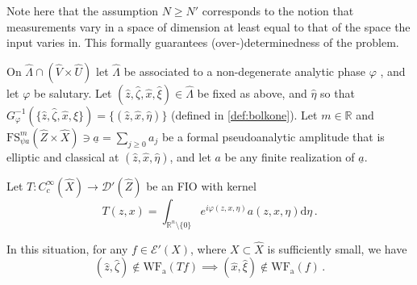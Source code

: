 \documentclass[
	fontsize=11pt, 
	twoside=false, 
	abstract=true, 
	a4paper,
]{scrartcl}
\newcommand{\sem}{\setminus\{0\}}
\newcommand{\RR}{\mathbb{R}}
\newcommand{\dd}{\mathrm{d}}
\newcommand{\wf}{\mathrm{WF}_{\mathrm{a}}}
\newcommand{\ud}[1]{\underline{#1}}
\begin{document}
Note here that the assumption $N\geq N'$ corresponds to the notion that measurements vary in a space of dimension at least equal to that of the space the input varies in. This formally guarantees (over-)determinedness of the problem.

\begin{theorem}\label{thm:main}
	On $\hat\Lambda \cap (\hat V\times \hat U)$ let $\hat\Lambda$ be associated to a non-degenerate analytic phase $\varphi$%
	, and let $\varphi$ be salutary. Let $(\hat z, \hat \zeta, \hat x, \hat \xi) \in \hat\Lambda$ be fixed as above, and $\hat \eta$ so that $G_\varphi^{-1}(\{\hat z, \hat \zeta, \hat x, \hat \xi\}) = \{(\hat z, \hat x,\hat\eta)\}$ (defined in \cref{def:bolkone}). 
	Let $m\in\RR$ and $\mathrm{FS}^{m}_{\psi a}(\hat Z\times \hat X) \ni \ud{a} = \sum_{j\geq 0} a_j$ be a formal pseudoanalytic amplitude %
	that is elliptic and classical at $(\hat z,\hat x, \hat\eta)$, %
	and let $a$ be any finite realization of $\ud{a}$.%

	Let $T \colon C_c^\infty(\hat X) \to \mathcal{D}'(\hat Z)$ be an FIO with kernel 
	\begin{equation}\label{eq:giveFIO}
		T(z,x) = \int_{\RR^n\sem} e^{i\varphi(z,x,\eta)}a(z,x,\eta)\dd\eta\,.
	\end{equation}

	In this situation, for any $f\in \mathcal{E}'(X)$, where $X \subset \hat X$ is sufficiently small, we have
	\[
		(\hat z, \hat \zeta) \not\in \wf(Tf) \implies (\hat x, \hat \xi) \not\in \wf(f)\,.
	\]
\end{theorem}
\end{document}
